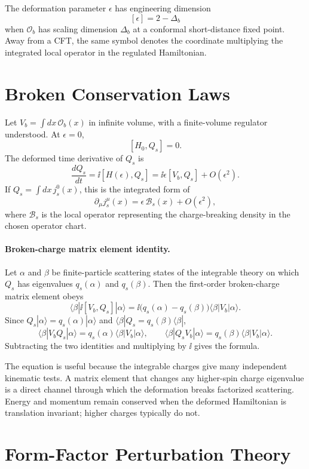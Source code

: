 The deformation parameter \(\epsilon\) has engineering dimension
\[
  [\epsilon]=2-\Delta_b
\]
when \(\mathcal O_b\) has scaling dimension \(\Delta_b\) at a conformal
short-distance fixed point.  Away from a CFT, the same symbol denotes the
coordinate multiplying the integrated local operator in the regulated
Hamiltonian.

\section{Broken Conservation Laws}

Let \(V_b=\int dx\,\mathcal O_b(x)\) in infinite volume, with a finite-volume
regulator understood.  At \(\epsilon=0\),
\[
  [H_0,Q_s]=0 .
\]
The deformed time derivative of \(Q_s\) is
\[
  \frac{dQ_s}{dt}
  =
  \ii[H(\epsilon),Q_s]
  =
  \ii\epsilon[V_b,Q_s]+O(\epsilon^2).
\]
If \(Q_s=\int dx\,j_s^0(x)\), this is the integrated form of
\[
  \partial_\mu j_s^\mu(x)=\epsilon\,\mathcal B_s(x)+O(\epsilon^2),
\]
where \(\mathcal B_s\) is the local operator representing the charge-breaking
density in the chosen operator chart.

\paragraph{Broken-charge matrix element identity.}
Let \(\alpha\) and \(\beta\) be finite-particle scattering states of the
integrable theory on which \(Q_s\) has eigenvalues \(q_s(\alpha)\) and
\(q_s(\beta)\).  Then the first-order broken-charge matrix element obeys
\[
  \langle\beta|\ii[V_b,Q_s]|\alpha\rangle
  =
  \ii\bigl(q_s(\alpha)-q_s(\beta)\bigr)
  \langle\beta|V_b|\alpha\rangle .
\]
Since \(Q_s|\alpha\rangle=q_s(\alpha)|\alpha\rangle\) and
\(\langle\beta|Q_s=q_s(\beta)\langle\beta|\),
\[
  \langle\beta|V_bQ_s|\alpha\rangle
  =
  q_s(\alpha)\langle\beta|V_b|\alpha\rangle,
  \qquad
  \langle\beta|Q_sV_b|\alpha\rangle
  =
  q_s(\beta)\langle\beta|V_b|\alpha\rangle .
\]
Subtracting the two identities and multiplying by \(\ii\) gives the formula.

The equation is useful because the integrable charges give many independent
kinematic tests.  A matrix element that changes any higher-spin charge
eigenvalue is a direct channel through which the deformation breaks
factorized scattering.  Energy and momentum remain conserved when the
deformed Hamiltonian is translation invariant; higher charges typically do
not.

\section{Form-Factor Perturbation Theory}

